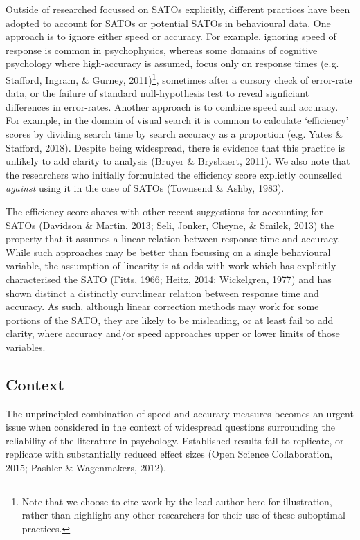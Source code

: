 \documentclass[floatsintext,doc]{apa6}
\theoremstyle{definition}
\theoremstyle{definition}
\theoremstyle{definition}
\theoremstyle{remark}
\begin{document}
Outside of researched focussed on SATOs explicitly, different practices
have been adopted to account for SATOs or potential SATOs in behavioural
data. One approach is to ignore either speed or accuracy. For example,
ignoring speed of response is common in psychophysics, whereas some
domains of cognitive psychology where high-accuracy is assumed, focus
only on response times (e.g. Stafford, Ingram, \& Gurney,
2011)\footnote{Note that we choose to cite work by the lead author here
  for illustration, rather than highlight any other researchers for
  their use of these suboptimal practices.}, sometimes after a cursory
check of error-rate data, or the failure of standard null-hypothesis
test to reveal signficiant differences in error-rates. Another approach
is to combine speed and accuracy. For example, in the domain of visual
search it is common to calculate `efficiency' scores by dividing search
time by search accuracy as a proportion (e.g. Yates \& Stafford, 2018).
Despite being widespread, there is evidence that this practice is
unlikely to add clarity to analysis (Bruyer \& Brysbaert, 2011). We also
note that the researchers who initially formulated the efficiency score
explictly counselled \emph{against} using it in the case of SATOs
(Townsend \& Ashby, 1983).

The efficiency score shares with other recent suggestions for accounting
for SATOs (Davidson \& Martin, 2013; Seli, Jonker, Cheyne, \& Smilek,
2013) the property that it assumes a linear relation between response
time and accuracy. While such approaches may be better than focussing on
a single behavioural variable, the assumption of linearity is at odds
with work which has explicitly characterised the SATO (Fitts, 1966;
Heitz, 2014; Wickelgren, 1977) and has shown distinct a distinctly
curvilinear relation between response time and accuracy. As such,
although linear correction methods may work for some portions of the
SATO, they are likely to be misleading, or at least fail to add clarity,
where accuracy and/or speed approaches upper or lower limits of those
variables.

\subsection{Context}\label{context}

The unprincipled combination of speed and accurary measures becomes an
urgent issue when considered in the context of widespread questions
surrounding the reliability of the literature in psychology. Established
results fail to replicate, or replicate with substantially reduced
effect sizes (Open Science Collaboration, 2015; Pashler \& Wagenmakers,
2012).
\end{document}
